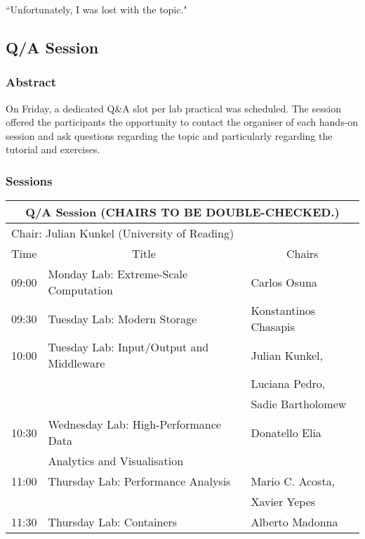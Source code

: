 ``Unfortunately, I was lost with the topic."

\subsection{Q/A Session}
\label{sec:qas}

\subsubsection{Abstract}

On Friday, a dedicated Q\&A slot per lab practical was scheduled. The session offered the participants the opportunity to contact the organiser of each hands-on session and ask questions regarding the topic and particularly regarding the tutorial and exercises.

\subsubsection{Sessions}

\begin{table}[H]
\begin{center}
\begin{tabular}{|l|l|l|}
\hline
\multicolumn{3}{|c|}{\textbf{Q/A Session (CHAIRS TO BE DOUBLE-CHECKED.)}} \\ \hline
\multicolumn{3}{|l|}{Chair: Julian Kunkel (University of Reading)} \\ \hline \hline
Time & \multicolumn{1}{c|}{Title} & \multicolumn{1}{c|}{Chairs} \\ \hline \hline
09:00 & Monday Lab: Extreme-Scale Computation & Carlos Osuna \\ \hline
09:30 & Tuesday Lab: Modern Storage & Konstantinos Chasapis \\ \hline
10:00 & Tuesday Lab: Input/Output and Middleware  & Julian Kunkel, \\
      &                                           & Luciana Pedro, \\
      &                                           & Sadie Bartholomew \\ \hline
10:30 & Wednesday Lab: High-Performance Data  & Donatello Elia \\
      & Analytics and Visualisation           &  \\ \hline
11:00 & Thursday Lab: Performance Analysis & Mario C. Acosta, \\
      &                                    & Xavier Yepes \\ \hline
11:30 & Thursday Lab: Containers & Alberto Madonna \\ \hline
\hline
\end{tabular}
\end{center}
\end{table}

